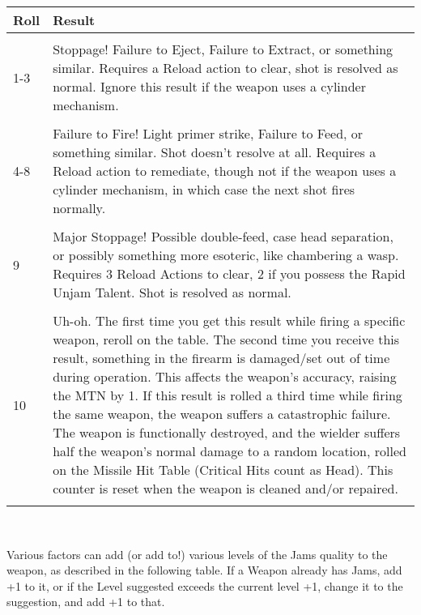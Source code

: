 \documentclass[a4paper, twocolumn, openany]{book}
\begin{document}
{{\centering
\begin{tabular}{lp{7cm}}
Roll 			&	Result \\ \hline \\
1-3				&	Stoppage! Failure to Eject, Failure to Extract, or something
					similar. Requires a Reload action to clear, shot is resolved as
					normal. Ignore this result if the weapon uses a cylinder
					mechanism.\\ \\
4-8				&	Failure to Fire! Light primer strike, Failure to Feed, or something
					similar. Shot doesn’t resolve at all. Requires a Reload action to
					remediate, though not if the weapon uses a cylinder mechanism,
					in which case the next shot fires normally.\\ \\
9				&	Major Stoppage! Possible double-feed, case head separation, or
					possibly something more esoteric, like chambering a wasp.
					Requires 3 Reload Actions to clear, 2 if you possess the Rapid
					Unjam Talent. Shot is resolved as normal.\\ \\
10				&	Uh-oh. The first time you get this result while firing a specific
	weapon, reroll on the table. The second time you receive this
	result, something in the firearm is damaged/set out of time during
	operation. This affects the weapon’s accuracy, raising the MTN
	by 1. If this result is rolled a third time while firing the same
	weapon, the weapon suffers a catastrophic failure. The weapon
	is functionally destroyed, and the wielder suffers half the
	weapon’s normal damage to a random location, rolled on the
	Missile Hit Table (Critical Hits count as Head). This counter is
	reset when the weapon is cleaned and/or repaired.\\ \\\hline
\end{tabular}\\[\baselineskip] }

Various factors can add (or add to!) various levels of the Jams quality to the weapon, as
described in the following table. If a Weapon already has Jams, add +1 to it, or if the Level
suggested exceeds the current level +1, change it to the suggestion, and add +1 to that.\\

}
\end{document}
